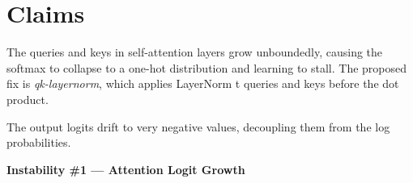 \documentclass[12pt,a4paper]{article}
\begin{document}
\section{Claims}

\begin{tcolorbox}[
  colback=lightblue,
  colframe=midblue,
  boxrule=0.8pt,
  arc=4pt,
  title=\textbf{Claim 1}
]
\small
The queries and keys in self-attention layers grow unboundedly, causing the softmax to collapse to a one-hot distribution and learning to stall. The proposed fix is \emph{qk-layernorm}, which applies LayerNorm t queries and keys before the dot product.
\end{tcolorbox}
\begin{tcolorbox}[
  colback=accentyellow,
  colframe=accentorange,
  boxrule=0.8pt,
  arc=4pt,
  title=\textbf{Claim 2}
]
\small
The output logits drift to very negative values, decoupling them from the log probabilities.
\end{tcolorbox}
\newpage

\begin{tcolorbox}[
  enhanced, colback=midblue!15, colframe=midblue,
  arc=6pt, boxrule=1.5pt, left=10pt, right=10pt, top=6pt, bottom=6pt
]
  {\large\bfseries\color{deepblue} Instability \#1 — Attention Logit Growth}
\end{tcolorbox}

\vspace{8pt}
\end{document}
